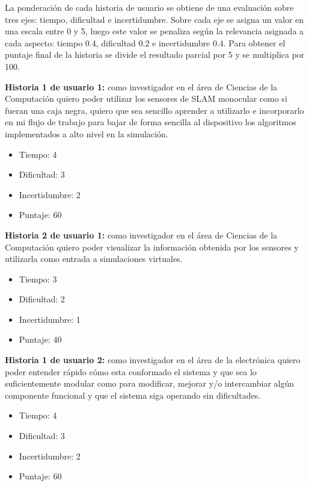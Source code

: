 \documentclass[
11pt, %
codirector, %
]{charter}
\begin{document}
La ponderación de cada historia de usuario se obtiene de una evaluación sobre tres ejes: tiempo, dificultad e incertidumbre. Sobre cada eje se asigna un valor en una escala entre 0 y 5, luego este valor se penaliza según la relevancia asignada a cada aspecto: tiempo 0.4, dificultad 0.2 e incertidumbre 0.4. Para obtener el puntaje final de la historia se divide el resultado parcial por 5 y se multiplica por 100.

\textbf{Historia 1 de usuario 1:} como investigador en el área de Ciencias de la Computación quiero poder utilizar los sensores de SLAM monocular como si fueran una caja negra, quiero que sea sencillo aprender a utilizarlo e incorporarlo en mi flujo de trabajo para bajar de forma sencilla al dispositivo los algoritmos implementados a alto nivel en la simulación.

\begin{itemize}
	\item Tiempo: 4
	\item Dificultad: 3
	\item Incertidumbre: 2
	\item Puntaje: 60 
\end{itemize}

\textbf{Historia 2 de usuario 1:} como investigador en el área de Ciencias de la Computación quiero poder visualizar la información obtenida por los sensores y utilizarla como entrada a simulaciones virtuales.

\begin{itemize}
	\item Tiempo: 3
	\item Dificultad: 2
	\item Incertidumbre: 1
	\item Puntaje: 40
\end{itemize}

\textbf{Historia 1 de usuario 2:} como investigador en el área de la electrónica quiero poder entender rápido cómo esta conformado el sistema y que sea lo suficientemente modular como para modificar, mejorar y/o intercambiar algún componente funcional y que el sistema siga operando sin dificultades.

\begin{itemize}
	\item Tiempo: 4
	\item Dificultad: 3
	\item Incertidumbre: 2
	\item Puntaje: 60
\end{itemize}
\end{document}
